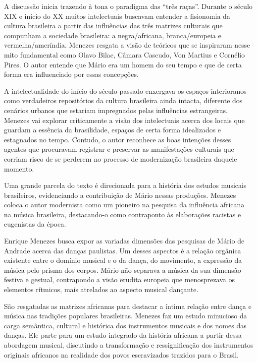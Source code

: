 A discussão inicia trazendo à tona o paradigma das ``três raças''.
Durante o século XIX e início do XX muitos intelectuais buscavam
entender a fisionomia da cultura brasileira a partir das influências das
três matrizes culturais que compunham a sociedade brasileira: a
negra/africana, branca/europeia e vermelha/ameríndia. Menezes resgata a
visão de teóricos que se inspiraram nesse mito fundamental como Olavo
Bilac, Câmara Cascudo, Von Martius e Cornélio Pires. O autor entende que
Mário era um homem do seu tempo e que de certa forma era influenciado
por essas concepções.

A intelectualidade do início do século passado enxergava os espaços
interioranos como verdadeiros repositórios da cultura brasileira ainda
intacta, diferente dos cenários urbanos que estariam impregnados pelas
influências estrangeiras. Menezes vai explorar criticamente a visão dos
intelectuais acerca dos locais que guardam a essência da brasilidade,
espaços de certa forma idealizados e estagnados no tempo. Contudo, o
autor reconhece as boas intenções desses agentes que procuravam
registrar e preservar as manifestações culturais que corriam risco de se
perderem no processo de modernização brasileira daquele momento.

Uma grande parcela do texto é direcionada para a história dos estudos
musicais brasileiros, evidenciando a contribuição de Mário nessas
produções. Menezes coloca o autor modernista como um pioneiro na
pesquisa da influência africana na música brasileira, destacando-o como
contraponto às elaborações racistas e eugenistas da época.

Enrique Menezes busca expor as variadas dimensões das pesquisas de Mário
de Andrade acerca das danças paulistas. Um desses aspectos é a relação
orgânica existente entre o domínio musical e o da dança, do movimento, a
expressão da música pelo prisma dos corpos. Mário não separava a música
da sua dimensão festiva e gestual, contrapondo a visão erudita europeia
que menosprezava os elementos rítmicos, mais atrelados ao aspecto
musical dançante.

São resgatadas as matrizes africanas para destacar a íntima relação
entre dança e música nas tradições populares brasileiras. Menezes faz um
estudo minucioso da carga semântica, cultural e histórica dos
instrumentos musicais e dos nomes das danças. Ele parte para um estudo
integrado da história africana a partir dessa abordagem musical,
discutindo a transformação e ressignificação dos instrumentos originais
africanos na realidade dos povos escravizados trazidos para o Brasil.

